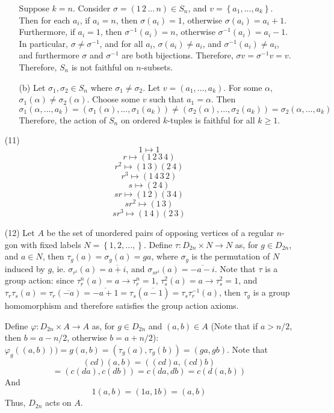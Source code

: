 \documentclass[12pt]{article}
\begin{document}
\begin{itemize}
\begin{itemize}
Suppose $k = n$. Consider $\sigma = (1 \, 2 \, ... \, n) \in S_n$, and $v = \left\lbrace a_1, ..., a_k \right\rbrace$. Then for each $a_i$, if $a_i = n$, then $\sigma(a_i) = 1$, otherwise $\sigma(a_i) = a_i + 1$. Furthermore, if $a_i = 1$, then $\sigma^{-1}(a_i) = n$, otherwise $\sigma^{-1}(a_i) = a_i - 1$. In particular, $\sigma \neq \sigma^{-1}$, and for all $a_i$, $\sigma(a_i) \neq a_i$, and $\sigma^{-1}(a_i) \neq a_i$, and furthermore $\sigma$ and $\sigma^{-1}$ are both bijections. Therefore, $\sigma v = \sigma^{-1} v = v$. Therefore, $S_n$ is not faithful on $n$-subsets.
\item[(b)]
Let $\sigma_1, \sigma_2 \in S_n$ where $\sigma_1 \neq \sigma_2$. Let $v = (a_1, ..., a_k)$. For some $\alpha$, $\sigma_1(\alpha) \neq \sigma_2(\alpha)$. Choose some $v$ such that $a_1 = \alpha$. Then
$$\sigma_1(\alpha, ..., a_k) = (\sigma_1(\alpha), ...,\sigma_1(a_k)) \neq (\sigma_2(\alpha), ..., \sigma_2(a_k)) = \sigma_2(\alpha, ..., a_k)$$
Therefore, the action of $S_n$ on ordered $k$-tuples is faithful for all $k \geq 1$.
\end{itemize}
\item[(11)]
$$1 \mapsto 1$$
$$r \mapsto (1 \, 2 \, 3 \, 4)$$
$$r^2 \mapsto (1 \, 3)(2 \, 4)$$
$$r^3 \mapsto (1 \, 4 \, 3 \, 2)$$
$$s \mapsto (2 \, 4)$$
$$sr \mapsto (1 \, 2)(3 \, 4)$$
$$sr^2 \mapsto (1 \, 3)$$
$$sr^3 \mapsto (1 \, 4)(2 \, 3)$$
\item[(12)]
Let $A$ be the set of unordered pairs of opposing vertices of a regular $n$-gon with fixed labels $N = \left\lbrace 1, 2, ..., \right\rbrace$. Define $\tau: D_{2n} \times N \rightarrow N$ as, for $g \in D_{2n}$, and $a \in N$, then $\tau_g(a) = \sigma_g(a) = ga$, where $\sigma_g$ is the permutation of $N$ induced by $g$, ie. $\sigma_{r^i}(a) = \overline{a + i}$, and $\sigma_{sr^i}(a) = \overline{-a - i}$. Note that $\tau$ is a group action: since $\tau_r^n(a) = a \rightarrow \tau_r^n = 1$, $\tau_s^2(a) = a \rightarrow \tau_s^2 = 1$, and $\tau_r\tau_s(a)  = \tau_r(\overline{-a}) = \overline{-a + 1} = \tau_s(\overline{a - 1}) = \tau_s\tau_r^{-1}(a)$, then $\tau_g$ is a group homomorphism and therefore satisfies the group action axioms.

Define $\varphi: D_{2n} \times A \rightarrow A$ as, for $g \in D_{2n}$ and $(a, b) \in A$ (Note that if $a > n/2$, then $b = a - n/2$, otherwise $b = a + n/2$): $\varphi_g((a, b))) = g(a, b) = (\tau_g(a), \tau_g(b)) = (ga, gb)$. Note that
$$(cd)(a, b) = ((cd)a, (cd)b)$$
$$ = (c(da), c(db)) = c(da, db) = c(d(a, b))$$
And
$$1(a, b) = (1a, 1b) = (a, b)$$
Thus, $D_{2n}$ acts on $A$.


\end{itemize}
\end{document}
